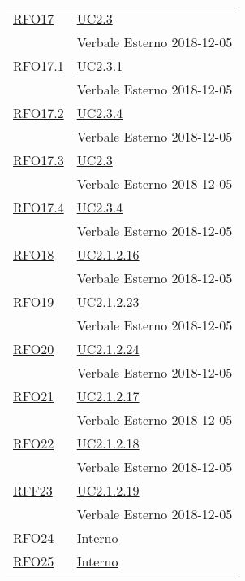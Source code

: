 \begin{longtable}{|>{\centering}m{5cm}|m{5cm}<{\centering}|}
	\hyperlink{RFO17}{RFO17} & \hyperref[UC2.3]{UC2.3}\\ & Verbale Esterno 2018-12-05\\ \hline
	
	\hyperlink{RFO17.1}{RFO17.1} & \hyperref[UC2.3.1]{UC2.3.1}\\ & Verbale Esterno 2018-12-05\\ \hline
	
	\hyperlink{RFO17.2}{RFO17.2} & \hyperref[UC2.3.4]{UC2.3.4}\\ & Verbale Esterno 2018-12-05\\ \hline
	
	\hyperlink{RFO17.3}{RFO17.3} & \hyperref[UC2.3]{UC2.3}\\ & Verbale Esterno 2018-12-05\\ \hline
	
	\hyperlink{RFO17.4}{RFO17.4} & \hyperref[UC2.3.4]{UC2.3.4}\\ & Verbale Esterno 2018-12-05\\ \hline
	
	\hyperlink{RFO18}{RFO18} & \hyperref[UC2.1.2.16]{UC2.1.2.16}\\ & Verbale Esterno 2018-12-05\\ \hline
	
	\hyperlink{RFO19}{RFO19} & \hyperref[UC2.1.2.23]{UC2.1.2.23}\\ & Verbale Esterno 2018-12-05\\ \hline
	
	\hyperlink{RFO20}{RFO20} & \hyperref[UC2.1.2.24]{UC2.1.2.24}\\ & Verbale Esterno 2018-12-05\\ \hline
	
	\hyperlink{RFO21}{RFO21} & \hyperref[UC2.1.2.17]{UC2.1.2.17}\\ & Verbale Esterno 2018-12-05\\ \hline
	
	\hyperlink{RFO22}{RFO22} & \hyperref[UC2.1.2.18]{UC2.1.2.18}\\ & Verbale Esterno 2018-12-05\\ \hline
	
	\hyperlink{RFF23}{RFF23} & \hyperref[UC2.1.2.19]{UC2.1.2.19}\\ & Verbale Esterno 2018-12-05\\ \hline
	
	\hyperlink{RFO24}{RFO24} & \hyperref[Interno]{Interno}\\ \hline
	
	\hyperlink{RFO25}{RFO25} & \hyperref[Interno]{Interno}\\ \hline
	

\end{longtable}
